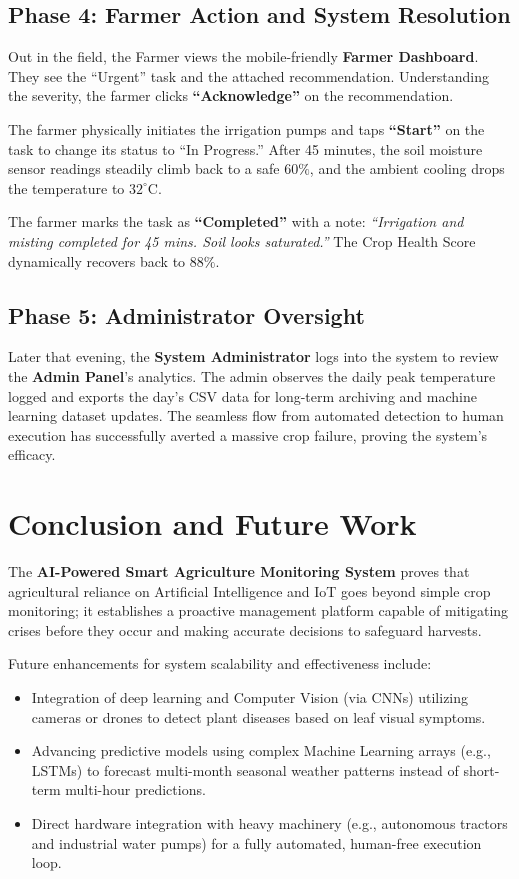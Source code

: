 \documentclass[12pt,a4paper]{article}
\begin{document}
\subsection{Phase 4: Farmer Action and System Resolution}
Out in the field, the Farmer views the mobile-friendly \textbf{Farmer Dashboard}. They see the ``Urgent'' task and the attached recommendation. Understanding the severity, the farmer clicks \textbf{``Acknowledge''} on the recommendation. 

The farmer physically initiates the irrigation pumps and taps \textbf{``Start''} on the task to change its status to ``In Progress.'' After 45 minutes, the soil moisture sensor readings steadily climb back to a safe $60\%$, and the ambient cooling drops the temperature to $32^\circ$C. 

The farmer marks the task as \textbf{``Completed''} with a note: \textit{``Irrigation and misting completed for 45 mins. Soil looks saturated.''} The Crop Health Score dynamically recovers back to $88\%$.

\subsection{Phase 5: Administrator Oversight}
Later that evening, the \textbf{System Administrator} logs into the system to review the \textbf{Admin Panel}'s analytics. The admin observes the daily peak temperature logged and exports the day's CSV data for long-term archiving and machine learning dataset updates. The seamless flow from automated detection to human execution has successfully averted a massive crop failure, proving the system's efficacy.

\section{Conclusion and Future Work}
The \textbf{AI-Powered Smart Agriculture Monitoring System} proves that agricultural reliance on Artificial Intelligence and IoT goes beyond simple crop monitoring; it establishes a proactive management platform capable of mitigating crises before they occur and making accurate decisions to safeguard harvests. 

Future enhancements for system scalability and effectiveness include:
\begin{itemize}
    \item Integration of deep learning and Computer Vision (via CNNs) utilizing cameras or drones to detect plant diseases based on leaf visual symptoms.
    \item Advancing predictive models using complex Machine Learning arrays (e.g., LSTMs) to forecast multi-month seasonal weather patterns instead of short-term multi-hour predictions.
    \item Direct hardware integration with heavy machinery (e.g., autonomous tractors and industrial water pumps) for a fully automated, human-free execution loop.
\end{itemize}
\end{document}
